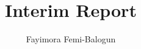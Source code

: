 \documentclass[a4paper,12pt,twoside]{report}
\begin{document}
\title{\LARGE {\bf Interim Report}\\
 \vspace*{6mm}
}

\author{Fayimora Femi-Balogun}
\normallinespacing
\maketitle

\preface

%
%
%

\body


% 
% 


%



%
%
\end{document}
